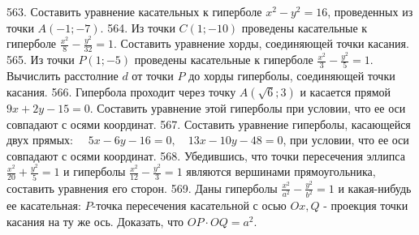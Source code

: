 563. Составить уравнение касательных к гиперболе $x^2-y^2=16$, проведенных из точки $A(-1 ;-7)$.
564. Из точки $C(1 ;-10)$ проведены касательные к гиперболе $\frac{x^2}{8}-\frac{y^2}{32}=1$. Составить уравнение хорды, соединяющей точки касания.
565. Из точки $P(1 ;-5)$ проведены касательные к гиперболе $\frac{x^2}{3}-\frac{y^2}{5}=1$. Вычислить расстолние $d$ от точки $P$ до хорды гиперболы, соединяющей точки касания.
566. Гипербола проходит через точку $A(\sqrt{6} ; 3)$ и касается прямой $9 x+2 y-15=0$. Составить уравнение этой гиперболы при условии, что ее оси совпадают с осями координат.
567. Составить уравнение гиперболы, касающейся двух прямых: $\quad 5 x-6 y-16=0, \quad 13 x-10 y-48=0$, при условии, что ее оси совпадают с осями координат.
568. Убедившись, что точки пересечения эллипса $\frac{x^2}{20}+\frac{y^2}{5}=1$ и гиперболы $\frac{x^2}{12}-\frac{y^2}{3}=1$ являются вершинами прямоугольника, составить уравнения его сторон.
569. Даны гиперболы $\frac{x^2}{a^2}-\frac{y^2}{b^2}=1$ и какая-нибудь ее касательная: $P$-точка пересечения касательной с осью $O x, Q$ - проекция точки касания на ту же ось. Доказать, что $O P \cdot O Q=a^2$.
